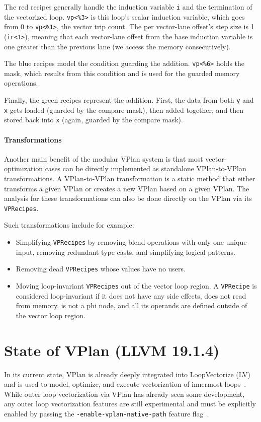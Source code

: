 \documentclass[sigplan,11pt,nonacm]{acmart}
\begin{document}
The red recipes generally handle the induction variable \texttt{i} and the termination of the 
vectorized loop. \texttt{vp<\%3>} is this loop's scalar induction variable, which goes from 0 to 
\texttt{vp<\%1>}, the vector trip count. The per vector-lane offset's step size is 1 (\texttt{ir<1>}), 
meaning that each 
vector-lane offset from the base induction variable is one greater than the previous lane (we access the 
memory consecutively).

The blue recipes model the condition guarding the addition. \texttt{vp<\%6>} holds the mask, which 
results from this condition and is used for the guarded memory operations.

Finally, the green recipes represent the addition. First, the data from both \texttt{y} and \texttt{x} 
gets loaded (guarded by the compare mask), then added together, and then stored back into 
\texttt{x} (again, guarded by the compare mask).

\paragraph{Transformations}
Another main benefit of the modular VPlan system is that most vector-optimization cases can 
be directly implemented as standalone VPlan-to-VPlan transformations. A VPlan-to-VPlan 
transformation is a static method that either transforms a given VPlan or creates a new 
VPlan based on a given VPlan. The analysis for these transformations can also be done 
directly on the VPlan via its \texttt{VPRecipes}.

Such transformations include for example:
\begin{itemize}
  \item Simplifying \texttt{VPRecipes} by removing blend operations with only one unique input, removing 
  redundant type casts, and simplifying logical patterns.
  \item Removing dead \texttt{VPRecipes} whose values have no users.
  \item Moving loop-invariant \texttt{VPRecipes} out of the vector loop region. A \texttt{VPRecipe} is 
  considered loop-invariant if it does not have any side effects, does not read from memory, is not a 
  phi node, and all its operands are defined outside of the vector loop region.
\end{itemize}

\section{State of VPlan (LLVM 19.1.4)}
In its current state, VPlan is already deeply integrated into LoopVectorize (LV) and is
used to model, optimize, and execute vectorization of innermost loops~\cite{llvmvplan,llvmintrvplan,llvmvplanupdate}. 
While outer loop vectorization via VPlan has already seen some development, any 
outer loop vectorization features are still experimental and must be explicitly enabled 
by passing the \texttt{-enable-\allowbreak vplan-\allowbreak native-\allowbreak path} 
feature flag~\cite{llvmouterloop,llvmouterloopstatus}.
\end{document}
